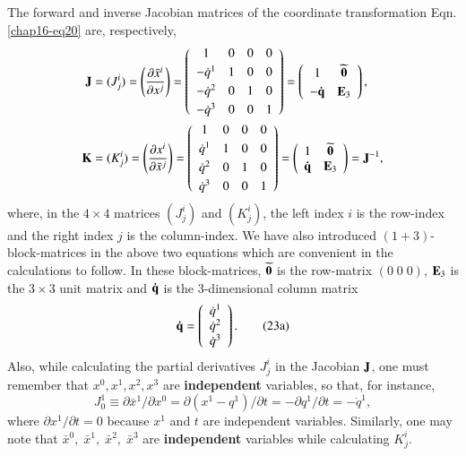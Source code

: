 The forward and inverse Jacobian matrices of the coordinate transformation  Eqn. \eqref{chap16-eq20} are, respectively, 
\begin{align}
\mathbf{J} &=(J^i_j)=\left(\frac{\partial \bar{x}^i}{\partial x^j}\right)=\left(\begin{array}{cccc}1&0&0&0\\[3pt]
-\dot{q}^{1}&1&0&0\\[3pt]
-\dot{q}^{2}&0&1&0 \\[3pt]
-\dot{q}^{3}&0&0&1 \end{array}\right)
=\left(\begin{array}{cc} 1 & \widetilde{\mathbf{0}}\\[3pt]
-\mathbf{\dot{q}} & \mathbf{E}_3 \end{array}\right),\label{chap16-eq22} \\
\mathbf{K}&=(K^i_j)=\left(\frac{\partial x^i}{\partial 
\bar x^j}\right)=\left(\begin{array}{cccc}1&0&0&0\\[3pt]
\dot{q}^{1}&1&0&0\\[3pt]
\dot{q}^{2}&0&1&0 \\[3pt]
\dot{q}^{3}&0&0&1 \end{array}\right)
= \left(\begin{array}{cc} 1 &\widetilde{\mathbf{0}}\\
\mathbf{\dot{q}} & {\mathbf{E}}_3 \end{array}\right)
=\mathbf{J}^{-1},\label{chap16-eq23}
\end{align}
where, in the $4\times4$ matrices $(J^i_j)$ and $(K^i_j)$, the left  index $i$ is the row-index and the right index $j$ is the column-index.  We have also introduced $(1+3)$-block-matrices in the above two equations which are convenient in the calculations to follow. In these block-matrices,  $\widetilde{\mathbf{0}}$ is the row-matrix $(0\;0\;0)$, $\mathbf{E}_3$  is the $3\times 3$ unit matrix and  $\mathbf{\dot{q}}$ is the 3-dimensional column matrix
\begin{align*}
\mathbf{\dot{q}}=\left(\begin{array}{c}\dot{q}^{1}\\ \dot{q}^2 \\
\dot{q}^3\end{array}\right).  \tag{23a}\label{chap16-eq23a}
\end{align*}
Also, while  calculating the partial derivatives  $J^i_j$ in the Jacobian ${\mathbf{J}}$, one must remember that $x^0, x^1, x^2, x^3$ are \textbf{independent} variables, so that, for instance, 
$$
J^1_0\equiv\partial \bar{x}^1/ \partial x^0 =\partial(x^1-q^1)/ \partial t = -\partial q^1/\partial t=-\dot{q}^1,
$$
where $\partial x^1/\partial t=0$ because $x^1$ and $t$ are independent variables. Similarly, one may note that $\bar{x}^0,\; \bar{x}^1,\;  \bar{x}^2,\;  \bar{x}^3$ are \textbf{independent} variables while calculating $K^i_j$.

